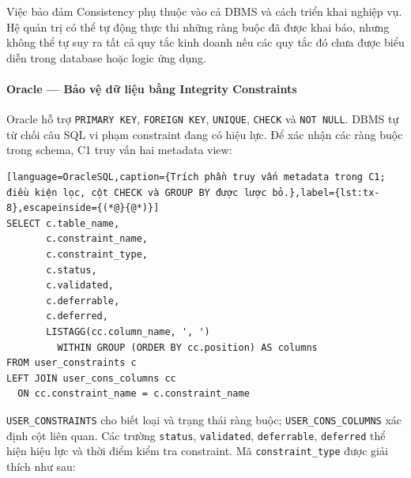 Việc bảo đảm Consistency phụ thuộc vào cả DBMS và cách triển khai nghiệp vụ. Hệ quản trị có thể tự động thực thi những ràng buộc đã được khai báo, nhưng không thể tự suy ra tất cả quy tắc kinh doanh nếu các quy tắc đó chưa được biểu diễn trong database hoặc logic ứng dụng.

\paragraph*{Oracle — Bảo vệ dữ liệu bằng Integrity Constraints}

Oracle hỗ trợ \texttt{PRIMARY KEY}, \texttt{FOREIGN KEY}, \texttt{UNIQUE}, \texttt{CHECK} và \texttt{NOT NULL}. DBMS tự từ chối câu SQL vi phạm constraint đang có hiệu lực. Để xác nhận các ràng buộc trong schema, C1 truy vấn hai metadata view:

\reportblockspace{72pt}
\begin{lstlisting}[language=OracleSQL,caption={Trích phần truy vấn metadata trong C1; điều kiện lọc, cột CHECK và GROUP BY được lược bỏ.},label={lst:tx-8},escapeinside={(*@}{@*)}]
SELECT c.table_name,
       c.constraint_name,
       c.constraint_type,
       c.status,
       c.validated,
       c.deferrable,
       c.deferred,
       LISTAGG(cc.column_name, ', ')
         WITHIN GROUP (ORDER BY cc.position) AS columns
FROM user_constraints c
LEFT JOIN user_cons_columns cc
  ON cc.constraint_name = c.constraint_name
\end{lstlisting}

\texttt{USER\_\allowbreak{}CONSTRAINTS} cho biết loại và trạng thái ràng buộc; \texttt{USER\_\allowbreak{}CONS\_\allowbreak{}COLUMNS} xác định cột liên quan. Các trường \texttt{status}, \texttt{validated}, \texttt{deferrable}, \texttt{deferred} thể hiện hiệu lực và thời điểm kiểm tra constraint. Mã \texttt{constraint\_\allowbreak{}type} được giải thích như sau:

